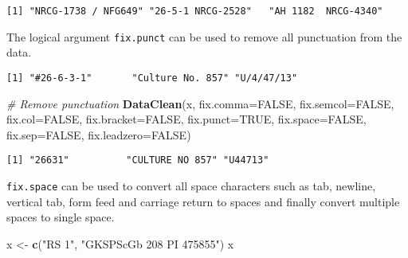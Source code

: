 \documentclass[]{article}
\newenvironment{Shaded}{\begin{snugshade}}{\end{snugshade}}
\newcommand{\CommentTok}[1]{\textcolor[rgb]{0.56,0.35,0.01}{\textit{#1}}}
\newcommand{\DataTypeTok}[1]{\textcolor[rgb]{0.13,0.29,0.53}{#1}}
\newcommand{\KeywordTok}[1]{\textcolor[rgb]{0.13,0.29,0.53}{\textbf{#1}}}
\newcommand{\NormalTok}[1]{#1}
\newcommand{\OtherTok}[1]{\textcolor[rgb]{0.56,0.35,0.01}{#1}}
\newcommand{\StringTok}[1]{\textcolor[rgb]{0.31,0.60,0.02}{#1}}
\begin{document}
\begin{verbatim}
[1] "NRCG-1738 / NFG649" "26-5-1 NRCG-2528"   "AH 1182  NRCG-4340"
\end{verbatim}

The logical argument \texttt{fix.punct} can be used to remove all
punctuation from the data.

\begin{Shaded}
\end{Shaded}

\begin{verbatim}
[1] "#26-6-3-1"       "Culture No. 857" "U/4/47/13"      
\end{verbatim}

\begin{Shaded}
\begin{Highlighting}[]
\CommentTok{# Remove punctuation}
\KeywordTok{DataClean}\NormalTok{(x, }\DataTypeTok{fix.comma=}\OtherTok{FALSE}\NormalTok{, }\DataTypeTok{fix.semcol=}\OtherTok{FALSE}\NormalTok{, }\DataTypeTok{fix.col=}\OtherTok{FALSE}\NormalTok{, }\DataTypeTok{fix.bracket=}\OtherTok{FALSE}\NormalTok{,}
          \DataTypeTok{fix.punct=}\OtherTok{TRUE}\NormalTok{,}
          \DataTypeTok{fix.space=}\OtherTok{FALSE}\NormalTok{, }\DataTypeTok{fix.sep=}\OtherTok{FALSE}\NormalTok{, }\DataTypeTok{fix.leadzero=}\OtherTok{FALSE}\NormalTok{)}
\end{Highlighting}
\end{Shaded}

\begin{verbatim}
[1] "26631"          "CULTURE NO 857" "U44713"        
\end{verbatim}

\texttt{fix.space} can be used to convert all space characters such as
tab, newline, vertical tab, form feed and carriage return to spaces and
finally convert multiple spaces to single space.

\begin{Shaded}
\begin{Highlighting}[]
\NormalTok{x <-}\StringTok{ }\KeywordTok{c}\NormalTok{(}\StringTok{"RS   1"}\NormalTok{, }\StringTok{"GKSPScGb 208  PI 475855"}\NormalTok{)}
\NormalTok{x}
\end{Highlighting}
\end{Shaded}
\end{document}
